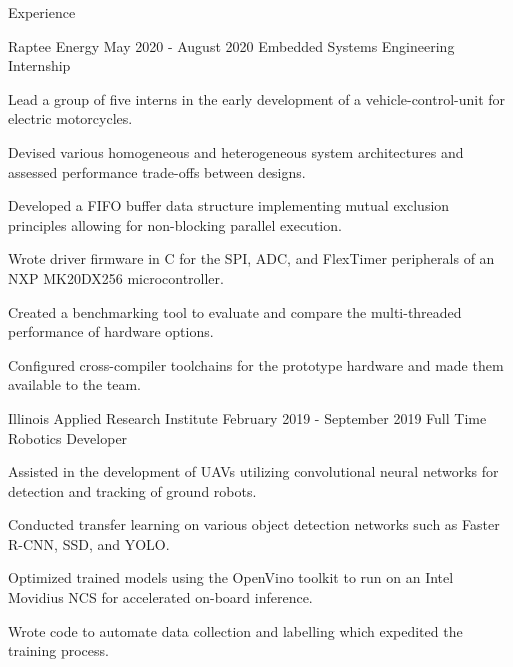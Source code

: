 \documentclass{resume} %
\begin{document}
    \begin{rSection}{Experience}

		\begin{rSubsection}{Raptee Energy} {May 2020 - August 2020} {Embedded Systems Engineering Internship}

			\item Lead a group of five interns in the early development of a vehicle-control-unit for electric motorcycles.
			\item Devised various homogeneous and heterogeneous system architectures and assessed performance trade-offs between designs.
			\item Developed a FIFO buffer data structure implementing mutual exclusion principles allowing for non-blocking parallel execution.
			\item Wrote driver firmware in C for the SPI, ADC, and FlexTimer peripherals of an NXP MK20DX256 microcontroller.
			\item Created a benchmarking tool to evaluate and compare the multi-threaded performance of hardware options.
			\item Configured cross-compiler toolchains for the prototype hardware and made them available to the team.

		\end{rSubsection}

        \begin{rSubsection}{Illinois Applied Research Institute} {February 2019 - September 2019} {Full Time Robotics Developer}

            \item Assisted in the development of UAVs utilizing convolutional neural networks for detection and tracking of ground robots.
            \item Conducted transfer learning on various object detection networks such as Faster R-CNN, SSD, and YOLO.
            \item Optimized trained models using the OpenVino toolkit to run on an Intel Movidius NCS for accelerated on-board inference.
            \item Wrote code to automate data collection and labelling which expedited the training process.

        \end{rSubsection}

    \end{rSection}

\end{document}
